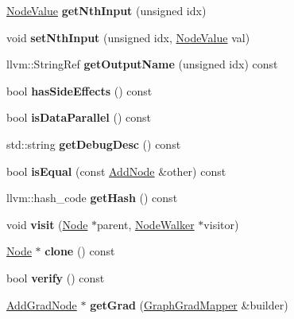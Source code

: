 \begin{DoxyCompactItemize}
\hyperlink{structglow_1_1_node_value}{Node\+Value} {\bfseries get\+Nth\+Input} (unsigned idx)
\item 
\mbox{\label{classglow_1_1_add_node_ab0c6050efd3298714e54e52eba1048c0}} 
void {\bfseries set\+Nth\+Input} (unsigned idx, \hyperlink{structglow_1_1_node_value}{Node\+Value} val)
\item 
\mbox{\label{classglow_1_1_add_node_ac22a1644905452938fcab5f6b816b8d6}} 
llvm\+::\+String\+Ref {\bfseries get\+Output\+Name} (unsigned idx) const
\item 
\mbox{\label{classglow_1_1_add_node_a944b64a4fd4961aa18ba5a3f97b6affa}} 
bool {\bfseries has\+Side\+Effects} () const
\item 
\mbox{\label{classglow_1_1_add_node_a9ffc3164cddd3870efce4cc25e19eaf9}} 
bool {\bfseries is\+Data\+Parallel} () const
\item 
\mbox{\label{classglow_1_1_add_node_ae19da520446c3c4019d6e89421a27796}} 
std\+::string {\bfseries get\+Debug\+Desc} () const
\item 
\mbox{\label{classglow_1_1_add_node_afaa518d0f08a1ba78edda77f6e65911e}} 
bool {\bfseries is\+Equal} (const \hyperlink{classglow_1_1_add_node}{Add\+Node} \&other) const
\item 
\mbox{\label{classglow_1_1_add_node_aeae2cea978c8ad3e1a12852cc95305ac}} 
llvm\+::hash\+\_\+code {\bfseries get\+Hash} () const
\item 
\mbox{\label{classglow_1_1_add_node_ac1f296303da675c6b5a55f61019dfc17}} 
void {\bfseries visit} (\hyperlink{classglow_1_1_node}{Node} $\ast$parent, \hyperlink{classglow_1_1_node_walker}{Node\+Walker} $\ast$visitor)
\item 
\mbox{\label{classglow_1_1_add_node_a45513b75b69d3d902e7db781001fe9ab}} 
\hyperlink{classglow_1_1_node}{Node} $\ast$ {\bfseries clone} () const
\item 
\mbox{\label{classglow_1_1_add_node_a497f451b3beb1bde6e1fd21834880d5b}} 
bool {\bfseries verify} () const
\item 
\mbox{\label{classglow_1_1_add_node_a9f908e9c5235c7ce13759c154e69bee0}} 
\hyperlink{classglow_1_1_add_grad_node}{Add\+Grad\+Node} $\ast$ {\bfseries get\+Grad} (\hyperlink{classglow_1_1_graph_grad_mapper}{Graph\+Grad\+Mapper} \&builder)
\end{DoxyCompactItemize}
